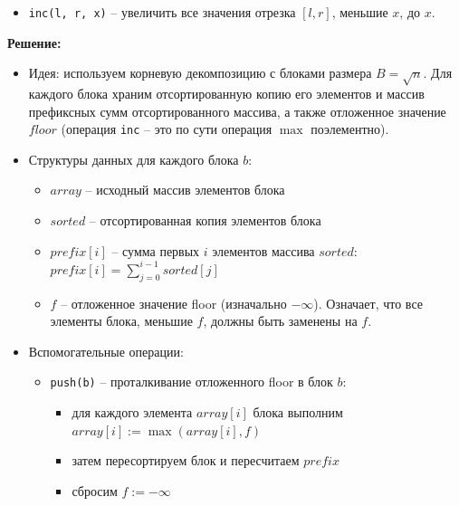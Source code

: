 \begin{enumerate}
\begin{itemize}
      \item \texttt{inc(l, r, x)} -- увеличить все значения отрезка $[l,r]$, меньшие $x$, до $x$.
    \end{itemize}

    \textbf{Решение:}

    \begin{itemize}

      \item Идея: используем корневую декомпозицию с блоками размера $B = \sqrt{n}$.
      Для каждого блока храним отсортированную копию его элементов и массив префиксных сумм отсортированного массива,
      а также отложенное значение $floor$ (операция \texttt{inc} -- это по сути операция $\max$ поэлементно).

      \item Структуры данных для каждого блока $b$:
      \begin{itemize}
        \item $array$ -- исходный массив элементов блока

        \item $sorted$ -- отсортированная копия элементов блока

        \item $prefix[i]$ -- сумма первых $i$ элементов массива $sorted$: $prefix[i] = \sum_{j=0}^{i-1} sorted[j]$

        \item $f$ -- отложенное значение floor (изначально $-\infty$). Означает, что все элементы блока, меньшие $f$, должны быть заменены на $f$.
      \end{itemize}

      \item Вспомогательные операции:

      \begin{itemize}

        \item \texttt{push(b)} -- проталкивание отложенного floor в блок $b$:
        \begin{itemize}
          \item для каждого элемента $array[i]$ блока выполним $array[i] := \max(array[i], f)$

          \item затем пересортируем блок и пересчитаем $prefix$

          \item сбросим $f := -\infty$
        \end{itemize}
        

\end{itemize}
\end{itemize}
\end{enumerate}
